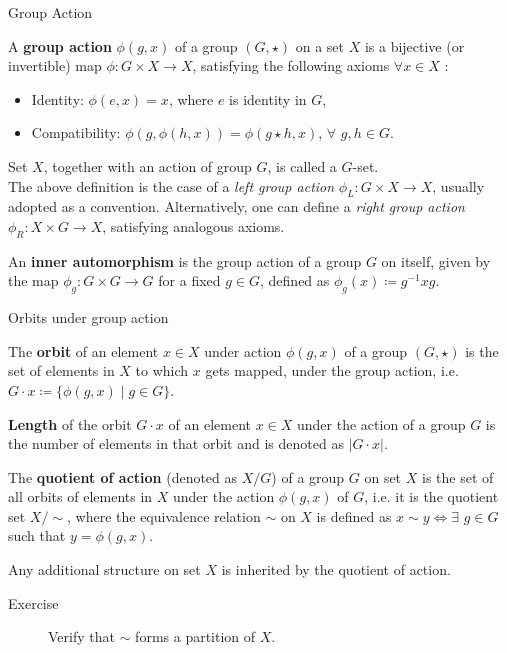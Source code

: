 \documentclass{beamer}
\newcommand\boldtext[1]{\textcolor{bolds}{\textbf{#1}}}
\newcommand\italictext[1]{\textcolor{italics}{\textit{#1}}}
\begin{document}
\begin{frame}{Group Action}
    \begin{definition}
        A \boldtext{group action} $\phi(g,x)$ of a group $(G,\star)$ on a set $X$ is a bijective (or invertible) map $\phi:G\times X\xrightarrow{}X$, satisfying the following axioms $\forall x\in X$ :
        \begin{itemize}
            \item Identity: $\phi(e,x)=x$, where $e$ is identity in $G$,
            \item Compatibility: $\phi(g,\phi(h,x))=\phi(g\star h,x)$, $\forall$ $g,h\in G$. 
        \end{itemize}
    \end{definition}
    Set $X$, together with an action of group $G$, is called a $G$-set.\\
    The above definition is the case of a \italictext{left group action} $\phi_L:G\times X\xrightarrow{}X$, usually adopted as a convention. Alternatively, one can define a \italictext{right group action} $\phi_R:X\times G\xrightarrow{}X$, satisfying analogous axioms.
    \begin{definition}
        An \boldtext{inner automorphism} is the group action of a group $G$ on itself, given by the map $\phi_g:G\times G\xrightarrow{}G$ for a fixed $g\in G$, defined as $\phi_g(x)\coloneqq g^{-1}xg$.
    \end{definition}
\end{frame}

\begin{frame}{Orbits under group action}
    \begin{definition}
        The \boldtext{orbit} of an element $x\in X$ under action $\phi(g,x)$ of a group $(G,\star)$ is the set of elements in $X$ to which $x$ gets mapped, under the group action, i.e. $G\cdot x\coloneqq\{\phi(g,x)\mid g\in G\}$.
    \end{definition}
    \begin{definition}
        \boldtext{Length} of the orbit $G\cdot x$ of an element $x\in X$ under the action of a group $G$ is the number of elements in that orbit and is denoted as $\lvert G\cdot x\rvert$. 
    \end{definition}
    \begin{definition}
        The \boldtext{quotient of action} (denoted as $X/G$) of a group $G$ on set $X$ is the set of all orbits of elements in $X$ under the action $\phi(g,x)$ of $G$, i.e. it is the quotient set $X/{\sim}$, where the equivalence relation $\sim$ on $X$ is defined as $x\sim y\iff\exists$ $g\in G$ such that $y=\phi(g,x)$.
    \end{definition}
    Any additional structure on set $X$ is inherited by the quotient of action. 
    \begin{description}
        \item[Exercise] Verify that $\sim$ forms a partition of $X$.
    \end{description}
\end{frame}
\end{document}

